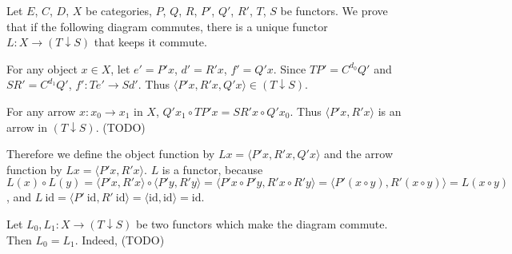 \documentclass[luatex]{article}
\begin{document}
\showArt

Let $E$, $C$, $D$, $X$ be categories, $P$, $Q$, $R$, $P'$, $Q'$, $R'$, $T$, $S$ be functors. We prove that if the following diagram commutes, there is a unique functor $L : X \rightarrow (T \downarrow S)$ that keeps it commute.

\begin{center}
\end{center}

For any object $x \in X$, let $e' = P' x$, $d' = R' x$, $f' = Q' x$. Since $TP' = C^{d_0}Q'$ and $SR' = C^{d_1}Q'$, $f' : Te' \rightarrow Sd'$. Thus $\langle P' x, R' x, Q' x \rangle \in (T \downarrow S)$.

For any arrow $x : x_0 \rightarrow x_1$ in $X$, $Q' x_1 \circ TP' x = SR' x \circ Q' x_0$. Thus $\langle P' x, R' x \rangle$ is an arrow in $(T \downarrow S)$. (TODO)

Therefore we define the object function by $Lx = \langle P' x, R' x, Q' x \rangle$ and the arrow function by $Lx = \langle P' x, R' x \rangle$. $L$ is a functor, because $L(x) \circ L(y) = \langle P' x, R' x \rangle \circ \langle P' y, R' y \rangle = \langle P' x \circ P' y, R' x \circ R' y \rangle = \langle P' (x \circ y), R' (x \circ y) \rangle = L(x \circ y)$, and $L\ \mathrm{id} = \langle P'\ \mathrm{id}, R'\ \mathrm{id} \rangle = \langle \mathrm{id}, \mathrm{id} \rangle = \mathrm{id}$.

Let $L_0, L_1 : X \rightarrow (T \downarrow S)$ be two functors which make the diagram commute. Then $L_0 = L_1$. Indeed, (TODO)

\subsubsection{}

\showArt
\end{document}
